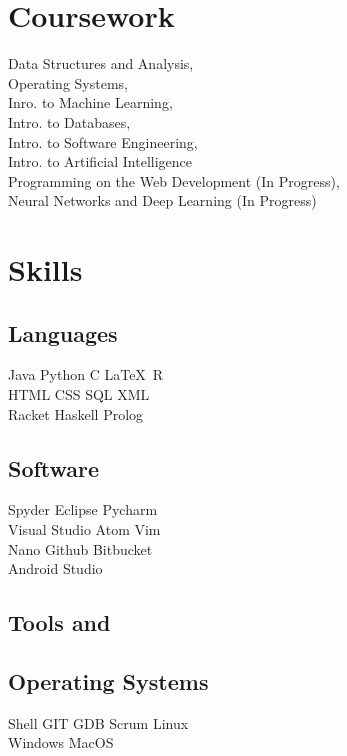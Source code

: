 \documentclass[]{dans-resume}
\begin{document}
\begin{minipage}[t]{0.30\textwidth}
\section{Coursework}
Data Structures and Analysis, \\
Operating Systems, \\
Inro. to Machine Learning,\\
Intro. to Databases,\\
Intro. to Software Engineering, \\
Intro. to Artificial Intelligence \\
Programming on the Web Development (In Progress), \\
Neural Networks and Deep Learning (In Progress)\\
\sectionsep

\section{Skills}

\subsection{Languages}
Java \textbullet{} Python \textbullet{} C \textbullet \LaTeX\ \textbullet R \\
HTML \textbullet{} CSS \textbullet{} SQL \textbullet{} XML\\
Racket \textbullet{} Haskell \textbullet{} Prolog\\
\sectionsep

\subsection{Software}
Spyder \textbullet{} Eclipse \textbullet{} Pycharm \\
Visual Studio \textbullet{} Atom \textbullet{} Vim \\
Nano \textbullet{} Github \textbullet{} Bitbucket \\
Android Studio
\sectionsep

\subsection{Tools and}
\subsection{Operating Systems}
Shell  \textbullet{} GIT \textbullet{} GDB  \textbullet{}
Scrum \textbullet{} Linux \\
Windows \textbullet{} MacOS \\
\sectionsep
\end{minipage}
\end{document}
